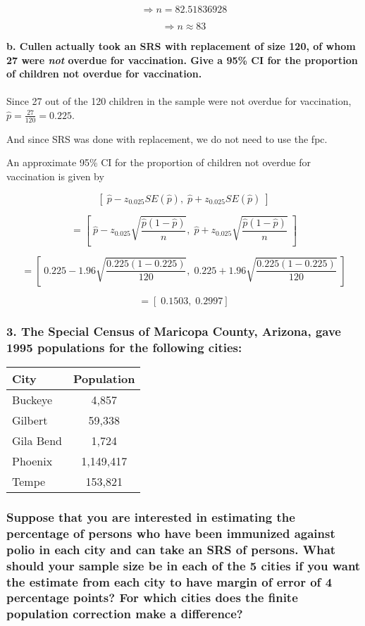 \documentclass[12pt]{article}
\begin{document}
\[
\Rightarrow n = 82.51836928
\]

\[
\Rightarrow n \approx  \boxed{83}
\]

\textbf{b. Cullen actually took an SRS with replacement of size 120, of whom 27 were \emph{not} overdue for vaccination. Give a 95\% CI for the proportion of children not overdue for vaccination.} \\
\\
Since 27 out of the 120 children in the sample were not overdue for
vaccination, \(\hat p = \frac{27}{120} = 0.225\).

And since SRS was done with replacement, we do not need to use the fpc.

An approximate 95\% CI for the proportion of children not overdue for
vaccination is given by

\[
\left[\;\hat p - z_{0.025}SE(\hat p),\;\hat p + z_{0.025}SE(\hat p)\;\right]
\]

\[
=\left[\;\hat p - z_{0.025}\sqrt{\frac{\hat p(1-\hat p)}{n}},\;\hat p + z_{0.025}\sqrt{\frac{\hat p(1-\hat p)}{n}}\;\right]
\]

\[
=\left[\;0.225 -1.96\sqrt{\frac{0.225(1-0.225)}{120}},\;0.225 + 1.96\sqrt{\frac{0.225(1-0.225)}{120}}\;\right]
\]

\[
=\boxed{\left[\;0.1503,\;0.2997 \right]}
\]

\subsubsection{3. The Special Census of Maricopa County, Arizona, gave
1995 populations for the following
cities:}\label{the-special-census-of-maricopa-county-arizona-gave-1995-populations-for-the-following-cities}

\begin{longtable}[]{@{}lc@{}}
\toprule\noalign{}
City & Population \\
\midrule\noalign{}
\endhead
\bottomrule\noalign{}
\endlastfoot
Buckeye & 4,857 \\
Gilbert & 59,338 \\
Gila Bend & 1,724 \\
Phoenix & 1,149,417 \\
Tempe & 153,821 \\
\end{longtable}

\subsubsection{Suppose that you are interested in estimating the
percentage of persons who have been immunized against polio in each city
and can take an SRS of persons. What should your sample size be in each
of the 5 cities if you want the estimate from each city to have margin
of error of 4 percentage points? For which cities does the finite
population correction make a
difference?}\label{suppose-that-you-are-interested-in-estimating-the-percentage-of-persons-who-have-been-immunized-against-polio-in-each-city-and-can-take-an-srs-of-persons.-what-should-your-sample-size-be-in-each-of-the-5-cities-if-you-want-the-estimate-from-each-city-to-have-margin-of-error-of-4-percentage-points-for-which-cities-does-the-finite-population-correction-make-a-difference} 
\end{document}
